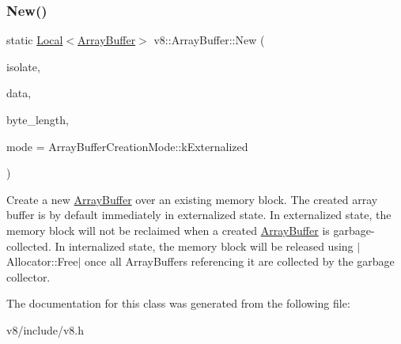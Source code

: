 \subsubsection{\texorpdfstring{New()}{New()}\hspace{0.1cm}{\footnotesize\ttfamily [2/2]}}
{\footnotesize\ttfamily static \mbox{\hyperlink{classv8_1_1Local}{Local}}$<$\mbox{\hyperlink{classv8_1_1ArrayBuffer}{Array\+Buffer}}$>$ v8\+::\+Array\+Buffer\+::\+New (\begin{DoxyParamCaption}\item[{\mbox{\hyperlink{classv8_1_1Isolate}{Isolate}} $\ast$}]{isolate,  }\item[{void $\ast$}]{data,  }\item[{size\+\_\+t}]{byte\+\_\+length,  }\item[{Array\+Buffer\+Creation\+Mode}]{mode = {\ttfamily ArrayBufferCreationMode\+:\+:kExternalized} }\end{DoxyParamCaption})\hspace{0.3cm}{\ttfamily [static]}}

Create a new \mbox{\hyperlink{classv8_1_1ArrayBuffer}{Array\+Buffer}} over an existing memory block. The created array buffer is by default immediately in externalized state. In externalized state, the memory block will not be reclaimed when a created \mbox{\hyperlink{classv8_1_1ArrayBuffer}{Array\+Buffer}} is garbage-\/collected. In internalized state, the memory block will be released using $\vert$\+Allocator\+::\+Free$\vert$ once all Array\+Buffers referencing it are collected by the garbage collector. 

The documentation for this class was generated from the following file\+:\begin{DoxyCompactItemize}
\item 
v8/include/v8.\+h\end{DoxyCompactItemize}

